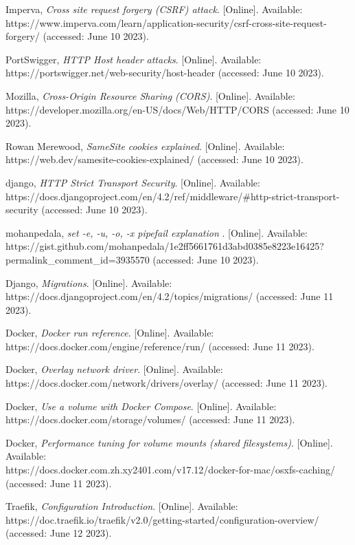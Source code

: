 \begin{referenceslist}
	\itemk Imperva, \emph{Cross site request forgery (CSRF) attack}. [Online]. Available: \\
	https://www.imperva.com/learn/application-security/csrf-cross-site-request-forgery/ (accessed: June 10 2023).
	
	\iteml PortSwigger, \emph{HTTP Host header attacks}. [Online]. Available: \\
	https://portswigger.net/web-security/host-header (accessed: June 10 2023).
	
	\itemm Mozilla, \emph{Cross-Origin Resource Sharing (CORS)}. [Online]. Available: \\
	https://developer.mozilla.org/en-US/docs/Web/HTTP/CORS (accessed: June 10 2023).
	
	\itemn Rowan Merewood, \emph{SameSite cookies explained}. [Online]. Available: \\
	https://web.dev/samesite-cookies-explained/ (accessed: June 10 2023).
	
	\itemo django, \emph{HTTP Strict Transport Security}. [Online]. Available: \\
	https://docs.djangoproject.com/en/4.2/ref/middleware/\#http-strict-transport-security (accessed: June 10 2023).
	
	\itemp mohanpedala, \emph{set -e, -u, -o, -x pipefail explanation }. [Online]. Available: \\
	https://gist.github.com/mohanpedala/1e2ff5661761d3abd0385e8223e16425? \\ permalink\_comment\_id=3935570 (accessed: June 10 2023).
	
	\itemq Django, \emph{Migrations}. [Online]. Available: \\
	https://docs.djangoproject.com/en/4.2/topics/migrations/  (accessed: June 11 2023).
	
	\itemr Docker, \emph{Docker run reference}. [Online]. Available: \\
	https://docs.docker.com/engine/reference/run/  (accessed: June 11 2023).
	
	\items Docker, \emph{Overlay network driver}. [Online]. Available: \\
	https://docs.docker.com/network/drivers/overlay/  (accessed: June 11 2023).
	
	\itemt Docker, \emph{Use a volume with Docker Compose}. [Online]. Available: \\
	https://docs.docker.com/storage/volumes/  (accessed: June 11 2023).
	
	\itemu Docker, \emph{Performance tuning for volume mounts (shared filesystems)}. [Online]. Available: \\
	https://docs.docker.com.zh.xy2401.com/v17.12/docker-for-mac/osxfs-caching/  (accessed: June 11 2023).
	
	\itemv Traefik, \emph{Configuration Introduction}. [Online]. Available: \\
	https://doc.traefik.io/traefik/v2.0/getting-started/configuration-overview/  (accessed: June 12 2023).
\end{referenceslist}
